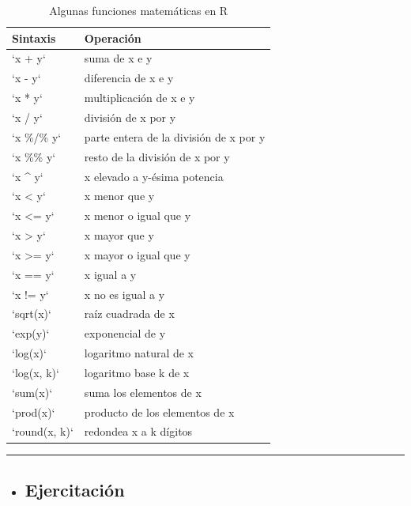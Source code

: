 \documentclass[
]{book}
\newenvironment{rmdblock}[1]
{\begin{shaded*}
		\begin{itemize}
			\renewcommand{\labelitemi}{
				\raisebox{-.7\height}[0pt][0pt]{
					{\setkeys{Gin}{width=3em,keepaspectratio}\texttt{[image: images/\#1]}}
				}
			}
			\item
		}
		{
		\end{itemize}
	\end{shaded*}
}
\newenvironment{rmdtip}
{\begin{rmdblock}{tip}}
	{\end{rmdblock}}
\begin{document}
\begin{longtable}[t]{ll}
\caption{\label{tab:funcbasic}Algunas funciones matemáticas en R}\\
\toprule
Sintaxis & Operación\\
\midrule
`x + y` & suma de x e y\\
`x - y` & diferencia de x e y\\
`x * y` & multiplicación de x e y\\
`x / y` & división de x por y\\
`x \%/\% y` & parte entera de la división de x por y\\
\addlinespace
`x \%\% y` & resto de la división de x por y\\
`x \textasciicircum{} y` & x elevado a y-ésima potencia\\
`x < y` & x menor que y\\
`x <= y` & x menor o igual que y\\
`x > y` & x mayor que y\\
\addlinespace
`x >= y` & x mayor o igual que y\\
`x == y` & x igual a y\\
`x != y` & x no es igual a y\\
`sqrt(x)` & raíz cuadrada de x\\
`exp(y)` & exponencial de y\\
\addlinespace
`log(x)` & logaritmo natural de x\\
`log(x, k)` & logaritmo base k de x\\
`sum(x)` & suma los elementos de x\\
`prod(x)` & producto de los elementos de x\\
`round(x, k)` & redondea x a k dígitos\\
\bottomrule
\end{longtable}

\begin{center}\rule{0.5\linewidth}{0.5pt}\end{center}

\begin{rmdtip}
\hypertarget{ejercitaciuxf3n}{%
\subsection{Ejercitación}\label{ejercitaciuxf3n}}
\end{rmdtip}
\end{document}
